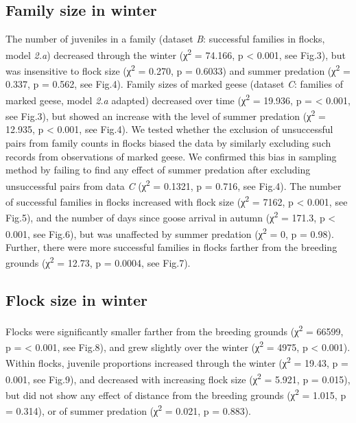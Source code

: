 \documentclass[10pt,twocolumn]{paper}
\begin{document}
\subsection{Family size in winter}\label{family-size-in-winter}

The number of juveniles in a family (dataset \emph{B}: successful
families in flocks, model \emph{2.a}) decreased through the winter
(χ\textsuperscript{2} = 74.166, p \textless{} 0.001, see Fig.3), but was
insensitive to flock size (χ\textsuperscript{2} = 0.270, p = 0.6033) and
summer predation (χ\textsuperscript{2} = 0.337, p = 0.562, see Fig.4).
Family sizes of marked geese (dataset \emph{C}: families of marked
geese, model \emph{2.a} adapted) decreased over time
(χ\textsuperscript{2} = 19.936, p = \textless{} 0.001, see Fig.3), but
showed an increase with the level of summer predation
(χ\textsuperscript{2} = 12.935, p \textless{} 0.001, see Fig.4). We
tested whether the exclusion of unsuccessful pairs from family counts in
flocks biased the data by similarly excluding such records from
observations of marked geese. We confirmed this bias in sampling method
by failing to find any effect of summer predation after excluding
unsuccessful pairs from data \emph{C} (χ\textsuperscript{2} = 0.1321, p
= 0.716, see Fig.4). The number of successful families in flocks
increased with flock size (χ\textsuperscript{2} = 7162, p \textless{}
0.001, see Fig.5), and the number of days since goose arrival in autumn
(χ\textsuperscript{2} = 171.3, p \textless{} 0.001, see Fig.6), but was
unaffected by summer predation (χ\textsuperscript{2} = 0, p = 0.98).
Further, there were more successful families in flocks farther from the
breeding grounds (χ\textsuperscript{2} = 12.73, p = 0.0004, see Fig.7).

\subsection{Flock size in winter}\label{flock-size-in-winter}

Flocks were significantly smaller farther from the breeding grounds
(χ\textsuperscript{2} = 66599, p = \textless{} 0.001, see Fig.8), and
grew slightly over the winter (χ\textsuperscript{2} = 4975, p
\textless{} 0.001). Within flocks, juvenile proportions increased
through the winter (χ\textsuperscript{2} = 19.43, p = 0.001, see Fig.9),
and decreased with increasing flock size (χ\textsuperscript{2} = 5.921,
p = 0.015), but did not show any effect of distance from the breeding
grounds (χ\textsuperscript{2} = 1.015, p = 0.314), or of summer
predation (χ\textsuperscript{2} = 0.021, p = 0.883).
\end{document}
